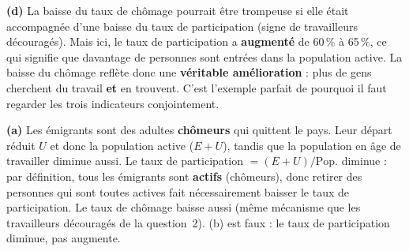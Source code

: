 
\begin{reponse}
\textbf{(d)} La baisse du taux de chômage pourrait être trompeuse si elle était accompagnée d'une baisse du taux de participation (signe de travailleurs découragés). Mais ici, le taux de participation a \textbf{augmenté} de 60\,\% à 65\,\%, ce qui signifie que davantage de personnes sont entrées dans la population active. La baisse du chômage reflète donc une \textbf{véritable amélioration} : plus de gens cherchent du travail \textbf{et} en trouvent. C'est l'exemple parfait de pourquoi il faut regarder les trois indicateurs conjointement.
\end{reponse}


\begin{reponse}
\textbf{(a)} Les émigrants sont des adultes \textbf{chômeurs} qui quittent le pays. Leur départ réduit $U$ et donc la population active ($E + U$), tandis que la population en âge de travailler diminue aussi. Le taux de participation $= (E+U)/\text{Pop.}$ diminue : par définition, tous les émigrants sont \textbf{actifs} (chômeurs), donc retirer des personnes qui sont toutes actives fait nécessairement baisser le taux de participation. Le taux de chômage baisse aussi (même mécanisme que les travailleurs découragés de la question~2). (b) est faux : le taux de participation diminue, pas augmente.
\end{reponse}


